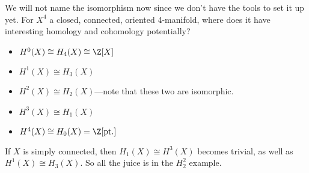We will not name the isomorphism now since we don't have the tools to set it up yet. For $X^4$ a closed, connected, oriented 4-manifold, where does it have interesting homology and cohomology potentially?
\begin{itemize}
\setlength\itemsep{-.2em}
    \item $H^0(X) \cong H_4(X) \cong \Z [X]$
    \item $H^1(X) \cong H_3(X)$
    \item $H^2(X) \cong H_2(X)$---note that these two are isomorphic. 
    \item $H^3(X) \cong H_1(X)$
    \item $H^4(X) \cong H_0(X) = \Z [ \text{pt.}] $
\end{itemize}
If $X$ is simply connected, then $H_1(X) \cong H^3(X)$ becomes trivial, as well as $H^1 (X) \cong H_3(X)$. So all the juice is in the $H_2^2$ example.
